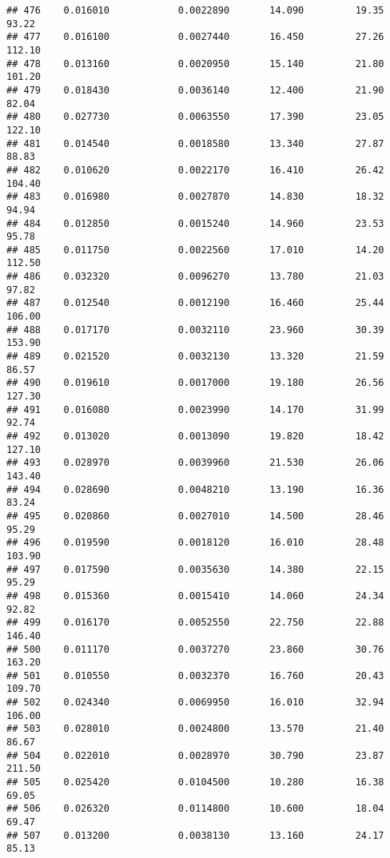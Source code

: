 \documentclass[
]{article}
\begin{document}
\begin{verbatim}
## 476    0.016010            0.0022890       14.090         19.35           93.22
## 477    0.016100            0.0027440       16.450         27.26          112.10
## 478    0.013160            0.0020950       15.140         21.80          101.20
## 479    0.018430            0.0036140       12.400         21.90           82.04
## 480    0.027730            0.0063550       17.390         23.05          122.10
## 481    0.014540            0.0018580       13.340         27.87           88.83
## 482    0.010620            0.0022170       16.410         26.42          104.40
## 483    0.016980            0.0027870       14.830         18.32           94.94
## 484    0.012850            0.0015240       14.960         23.53           95.78
## 485    0.011750            0.0022560       17.010         14.20          112.50
## 486    0.032320            0.0096270       13.780         21.03           97.82
## 487    0.012540            0.0012190       16.460         25.44          106.00
## 488    0.017170            0.0032110       23.960         30.39          153.90
## 489    0.021520            0.0032130       13.320         21.59           86.57
## 490    0.019610            0.0017000       19.180         26.56          127.30
## 491    0.016080            0.0023990       14.170         31.99           92.74
## 492    0.013020            0.0013090       19.820         18.42          127.10
## 493    0.028970            0.0039960       21.530         26.06          143.40
## 494    0.028690            0.0048210       13.190         16.36           83.24
## 495    0.020860            0.0027010       14.500         28.46           95.29
## 496    0.019590            0.0018120       16.010         28.48          103.90
## 497    0.017590            0.0035630       14.380         22.15           95.29
## 498    0.015360            0.0015410       14.060         24.34           92.82
## 499    0.016170            0.0052550       22.750         22.88          146.40
## 500    0.011170            0.0037270       23.860         30.76          163.20
## 501    0.010550            0.0032370       16.760         20.43          109.70
## 502    0.024340            0.0069950       16.010         32.94          106.00
## 503    0.028010            0.0024800       13.570         21.40           86.67
## 504    0.022010            0.0028970       30.790         23.87          211.50
## 505    0.025420            0.0104500       10.280         16.38           69.05
## 506    0.026320            0.0114800       10.600         18.04           69.47
## 507    0.013200            0.0038130       13.160         24.17           85.13

\end{verbatim}
\end{document}
